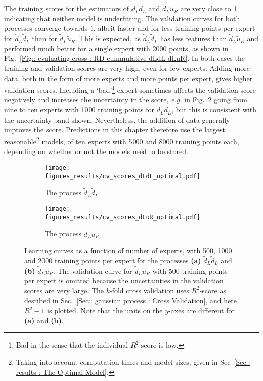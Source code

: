 \documentclass[twoside,english]{uiofysmaster}
\begin{document}
{{The training scores for the estimators of $\widetilde{d}_L \widetilde{d}_L$ and $\widetilde{d}_L \widetilde{u}_R$ are very close to 1, indicating that neither model is underfitting. The validation curves for both processes converge towards $1$, albeit faster and for less training points per expert for $\widetilde{d}_L \widetilde{d}_L$ than for $\widetilde{d}_L \widetilde{u}_R$. This is expected, as $\widetilde{d}_L \widetilde{d}_L$ has less features than $\widetilde{d}_L \widetilde{u}_R$ and performed much better for a single expert with 2000 points, as shown in Fig.~\ref{Fig:: evaluating cross : RD cummulative dLdL dLuR}. In both cases the training and validation scores are very high, even for few experts. Adding more data, both in the form of more experts and more points per expert, gives higher validation scores. Including a `bad'\footnote{Bad in the sense that the individual $R^2$-score is low.} expert sometimes affects the validation score negatively and increases the uncertainty in the score, \textit{e.g.} in Fig.~\ref{Fig :: results : Learning curves dLuL} going from nine to ten experts with 1000 training points for $\widetilde{d}_L \widetilde{d}_L$, but this is consistent with the uncertainty band shown. Nevertheless, the addition of data generally improves the score. Predictions in this chapter therefore use the largest reasonable\footnote{Taking into account computation times and model sizes, given in Sec~\ref{Sec:: results : The Optimal Model}.} models, of ten experts with 5000 and 8000 training points each, depending on whether or not the models need to be stored.



\begin{figure}
    \centering
    \begin{subfigure}[b]{0.7\textwidth}
        \texttt{[image: figures\_results/cv\_scores\_dLdL\_optimal.pdf]}
        \caption{The process $\widetilde{d}_L \widetilde{d}_L$}
        \label{Fig:: results : Learning curves dLdL}
    \end{subfigure}
    \begin{subfigure}[b]{0.7\textwidth}
        \texttt{[image: figures\_results/cv\_scores\_dLuR\_optimal.pdf]}
        \caption{The process $\widetilde{d}_L \widetilde{u}_R$}
        \label{Fig :: results : Learning curves dLuL}
    \end{subfigure}
    \caption{Learning curves as a function of number of experts, with 500, 1000 and 2000 training points per expert for the processes \textbf{(a)} $\widetilde{d}_L \widetilde{d}_L$ and \textbf{(b)} $\widetilde{d}_L\widetilde{u}_R$. The validation curve for $\widetilde{d}_L \widetilde{u}_R$ with 500 training points per expert is omitted because the uncertainties in the validation scores are very large. The $k$-fold cross validation uses $R^2$-score as desribed in Sec.~\ref{Sec:: gaussian process : Cross Validation}, and here $R^2-1$ is plotted. Note that the units on the $y$-axes are different for \textbf{(a)} and \textbf{(b)}.}
\label{Fig:: results : Learning curves}
\end{figure}


}}
\end{document}
